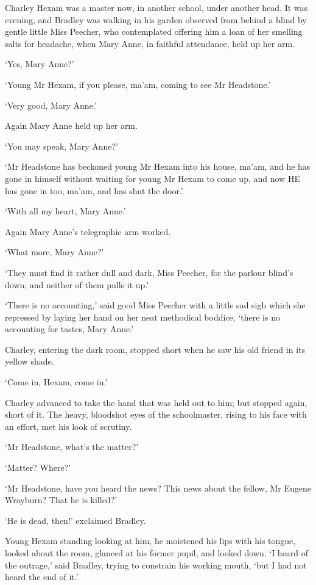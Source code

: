 Charley Hexam was a master now, in another school, under another head.
It was evening, and Bradley was walking in his garden observed from
behind a blind by gentle little Miss Peecher, who contemplated offering
him a loan of her smelling salts for headache, when Mary Anne, in
faithful attendance, held up her arm.

‘Yes, Mary Anne?’

‘Young Mr Hexam, if you please, ma’am, coming to see Mr Headstone.’

‘Very good, Mary Anne.’

Again Mary Anne held up her arm.

‘You may speak, Mary Anne?’

‘Mr Headstone has beckoned young Mr Hexam into his house, ma’am, and he
has gone in himself without waiting for young Mr Hexam to come up, and
now HE has gone in too, ma’am, and has shut the door.’

‘With all my heart, Mary Anne.’

Again Mary Anne’s telegraphic arm worked.

‘What more, Mary Anne?’

‘They must find it rather dull and dark, Miss Peecher, for the parlour
blind’s down, and neither of them pulls it up.’

‘There is no accounting,’ said good Miss Peecher with a little sad sigh
which she repressed by laying her hand on her neat methodical boddice,
‘there is no accounting for tastes, Mary Anne.’

Charley, entering the dark room, stopped short when he saw his old
friend in its yellow shade.

‘Come in, Hexam, come in.’

Charley advanced to take the hand that was held out to him; but stopped
again, short of it. The heavy, bloodshot eyes of the schoolmaster,
rising to his face with an effort, met his look of scrutiny.

‘Mr Headstone, what’s the matter?’

‘Matter? Where?’

‘Mr Headstone, have you heard the news? This news about the fellow, Mr
Eugene Wrayburn? That he is killed?’

‘He is dead, then!’ exclaimed Bradley.

Young Hexam standing looking at him, he moistened his lips with his
tongue, looked about the room, glanced at his former pupil, and looked
down. ‘I heard of the outrage,’ said Bradley, trying to constrain his
working mouth, ‘but I had not heard the end of it.’

